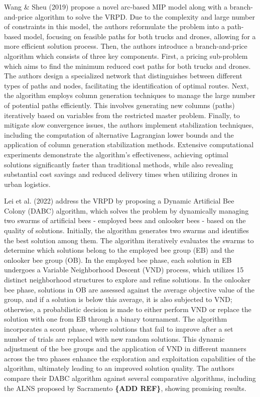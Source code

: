 \documentclass{article}
\begin{document}
	\par 
	Wang \& Sheu (2019) \cite{Wang2019} propose a novel arc-based MIP model along with a branch-and-price algorithm to solve the VRPD. Due to the complexity and large number of constraints in this model, the authors reformulate the problem into a path-based model, focusing on feasible paths for both trucks and drones, allowing for a more efficient solution process. Then, the authors introduce a branch-and-price algorithm which consists of three key components. First, a pricing sub-problem which aims to find the minimum reduced cost paths for both trucks and drones. The authors design a specialized network that distinguishes between different types of paths and nodes, facilitating the identification of optimal routes. Next, the algorithm employs column generation techniques to manage the large number of potential paths efficiently. This involves generating new columns (paths) iteratively based on variables from the restricted master problem. Finally, to mitigate slow convergence issues, the authors implement stabilization techniques, including the computation of alternative Lagrangian lower bounds and the application of column generation stabilization methods. Extensive computational experiments demonstrate the algorithm's effectiveness, achieving optimal solutions significantly faster than traditional methods, while also revealing substantial cost savings and reduced delivery times when utilizing drones in urban logistics.
	\par 
	Lei et al. (2022) \cite{Lei2022} address the VRPD by proposing a Dynamic Artificial Bee Colony (DABC) algorithm, which solves the problem by dynamically managing two swarms of artificial bees - employed bees and onlooker bees - based on the quality of solutions. Initially, the algorithm generates two swarms and identifies the best solution among them. The algorithm iteratively evaluates the swarms to determine which solutions belong to the employed bee group (EB) and the onlooker bee group (OB). In the employed bee phase, each solution in EB undergoes a Variable Neighborhood Descent (VND) process, which utilizes 15 distinct neighborhood structures to explore and refine solutions. In the onlooker bee phase, solutions in OB are assessed against the average objective value of the group, and if a solution is below this average, it is also subjected to VND; otherwise, a probabilistic decision is made to either perform VND or replace the solution with one from EB through a binary tournament. The algorithm incorporates a scout phase, where solutions that fail to improve after a set number of trials are replaced with new random solutions. This dynamic adjustment of the bee groups and the application of VND in different manners across the two phases enhance the exploration and exploitation capabilities of the algorithm, ultimately leading to an improved solution quality. The authors compare their DABC algorithm against several comparative algorithms, including the ALNS proposed by Sacramento \textbf{\{ADD REF\}}, showing promising results.
\end{document}

